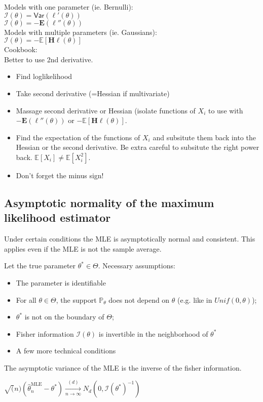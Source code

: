 Models with one parameter (ie. Bernulli):\\

$\mathcal{I}(\theta ) = \textsf{Var}(\ell '(\theta ))$\\

$\mathcal{I}(\theta ) = - \mathbf{E}(\ell ''(\theta ))$\\

Models with multiple parameters (ie. Gaussians):\\

$\mathcal{I}(\theta ) = -\mathbb E\left[\mathbf{H}\ell (\theta )\right]$\\

Cookbook:\\

Better to use 2nd derivative.\\

\begin{itemize}
  \item Find loglikelihood
  \item Take second derivative (=Hessian if multivariate)
  \item Massage second derivative or Hessian (isolate functions of $X_i$ to use with $- \mathbf{E}(\ell ''(\theta ))$ or $-\mathbb E\left[\mathbf{H}\ell (\theta )\right]$.
  \item Find the expectation of the functions of $X_i$ and subsitute them back into the Hessian or the second derivative. Be extra careful to subsitute the right power back. $\mathbb{E}[X_i] \neq \mathbb{E}[X_i^2]$.
  \item Don't forget the minus sign!
\end{itemize}

\subsection{Asymptotic normality of the maximum likelihood estimator}

Under certain conditions the MLE is asymptotically normal and consistent. This applies even if the MLE is not the sample average.

Let the true parameter $\theta^{*} \in \Theta$. Necessary assumptions:

\begin{itemize}
\item The parameter is identifiable
\item For all $\theta \in \Theta$, the support $\mathbb{P}_{\theta}$ does not depend on $\theta$ (e.g. like in $Unif(0,\theta)$);
\item $\theta^{*}$ is not on the boundary of $\Theta$;
\item Fisher information $\mathcal{I}(\theta)$  is invertible in the neighborhood of $\theta^{*}$
\item A few more technical conditions
\end{itemize}

The asymptotic variance of the MLE is the inverse of the fisher information.

$\sqrt(n)(\widehat{\theta }_ n^{\text {MLE}} - \theta^*) \xrightarrow[n \rightarrow \infty]{(d)} N_d(0,\mathcal{I}(\theta^* )^{-1})$\\